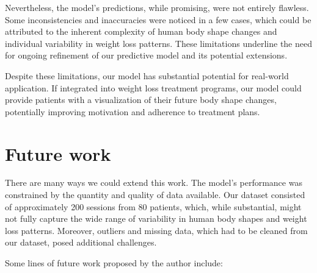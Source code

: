 Nevertheless, the model's predictions, while promising, were not entirely
flawless. Some inconsistencies and inaccuracies were noticed in a few cases,
which could be attributed to the inherent complexity of human body shape
changes and individual variability in weight loss patterns. These limitations
underline the need for ongoing refinement of our predictive model and its
potential extensions.

Despite these limitations, our model has substantial potential for real-world
application. If integrated into weight loss treatment programs, our model could
provide patients with a visualization of their future body shape changes,
potentially improving motivation and adherence to treatment plans.

\section{Future work}

There are many ways we could extend this work. The model's performance was
constrained by the quantity and quality of data available. Our dataset
consisted of approximately 200 sessions from 80 patients, which, while
substantial, might not fully capture the wide range of variability in human
body shapes and weight loss patterns. Moreover, outliers and missing data,
which had to be cleaned from our dataset, posed additional challenges.

Some lines of future work proposed by the author include:

